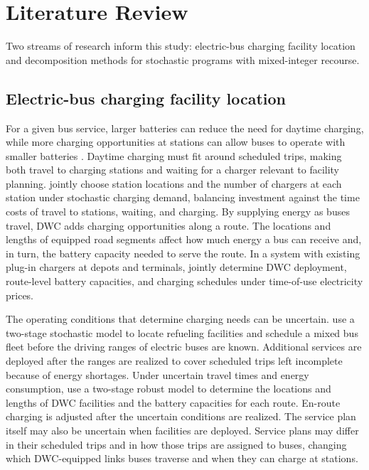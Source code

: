 \FloatBarrier
\section{Literature Review}
\label{sec:literature}

Two streams of research inform this study: electric-bus charging facility location and decomposition methods for stochastic programs with mixed-integer recourse.

\subsection{Electric-bus charging facility location}
\label{subsec:lit-wireless-bus}

For a given bus service, larger batteries can reduce the need for daytime charging, while more charging opportunities at stations can allow buses to operate with smaller batteries \citep{perumal_review_2022}.
Daytime charging must fit around scheduled trips, making both travel to charging stations and waiting for a charger relevant to facility planning.
\citet{bazarnovi_locating_2025} jointly choose station locations and the number of chargers at each station under stochastic charging demand, balancing investment against the time costs of travel to stations, waiting, and charging.
By supplying energy as buses travel, DWC adds charging opportunities along a route.
The locations and lengths of equipped road segments affect how much energy a bus can receive and, in turn, the battery capacity needed to serve the route.
In a system with existing plug-in chargers at depots and terminals, \citet{li_planning_2024} jointly determine DWC deployment, route-level battery capacities, and charging schedules under time-of-use electricity prices.

The operating conditions that determine charging needs can be uncertain.
\citet{li_mixed_2021} use a two-stage stochastic model to locate refueling facilities and schedule a mixed bus fleet before the driving ranges of electric buses are known.
Additional services are deployed after the ranges are realized to cover scheduled trips left incomplete because of energy shortages.
Under uncertain travel times and energy consumption, \citet{wang_reliable_2024} use a two-stage robust model to determine the locations and lengths of DWC facilities and the battery capacities for each route.
En-route charging is adjusted after the uncertain conditions are realized.
The service plan itself may also be uncertain when facilities are deployed.
Service plans may differ in their scheduled trips and in how those trips are assigned to buses, changing which DWC-equipped links buses traverse and when they can charge at stations.

